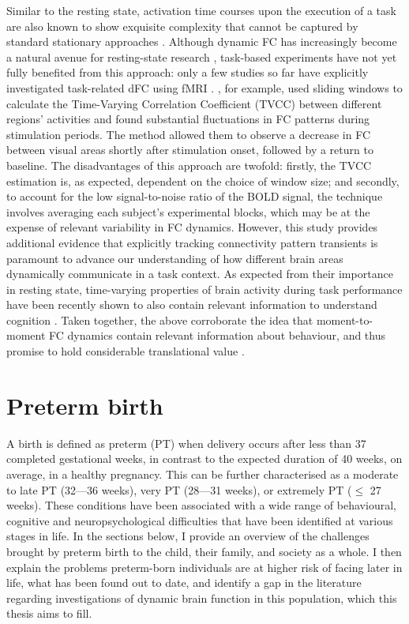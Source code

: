 Similar to the resting state, activation time courses upon the execution of a task are also known to show exquisite complexity that cannot be captured by standard stationary approaches \citep{Gonzalez-Castillo2018}. Although dynamic FC has increasingly become a natural avenue for resting-state research \citep{Preti2017}, task-based experiments have not yet fully benefited from this approach: only a few studies so far have explicitly investigated task-related dFC using fMRI \cite{Braun2015, Di2015, Simony2016}. \cite{Di2015}, for example, used sliding windows to calculate the Time-Varying Correlation Coefficient (TVCC) between different regions’ activities and found substantial fluctuations in FC patterns during stimulation periods. The method allowed them to observe a decrease in FC between visual areas shortly after stimulation onset, followed by a return to baseline. The disadvantages of this approach are twofold: firstly, the TVCC estimation is, as expected, dependent on the choice of window size; and secondly, to account for the low signal-to-noise ratio of the BOLD signal, the technique involves averaging each subject’s experimental blocks, which may be at the expense of relevant variability in FC dynamics. However, this study provides additional evidence that explicitly tracking connectivity pattern transients is paramount to advance our understanding of how different brain areas dynamically communicate in a task context. As expected from their importance in resting state, time-varying properties of brain activity during task performance have been recently shown to also contain relevant information to understand cognition \citep{Fong2019}. Taken together, the above corroborate the idea that moment-to-moment FC dynamics contain relevant information about behaviour, and thus promise to hold considerable translational value \citep{ Gonzalez-Castillo2018}.


\section{Preterm birth}\label{sub:preterm}

A birth is defined as preterm (PT) when delivery occurs after less than 37 completed gestational weeks, in contrast to the expected duration of 40 weeks, on average, in a healthy pregnancy. This can be further characterised as a moderate to late PT (32---36 weeks), very PT (28---31 weeks),  or extremely PT ($\leq$ 27 weeks). These conditions have been associated with a wide range of behavioural, cognitive and neuropsychological difficulties that have been identified at various stages in life. In the sections below, I provide an overview of the challenges brought by preterm birth to the child, their family, and society as a whole. I then explain the problems preterm-born individuals are at higher risk of facing later in life, what has been found out to date, and identify a gap in the literature regarding investigations of dynamic brain function in this population, which this thesis aims to fill. 



